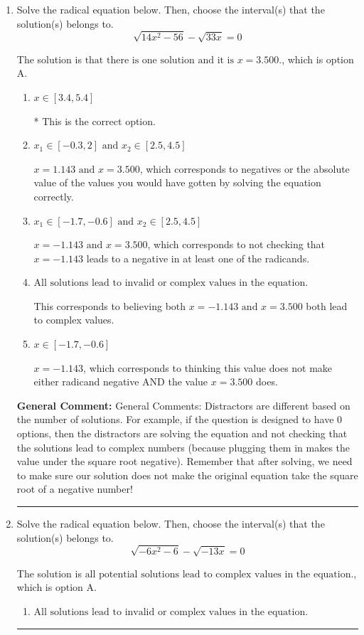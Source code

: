 \documentclass{extbook}[14pt]
\newcommand{\litem}[1]{\item #1

\rule{\textwidth}{0.4pt}}
\begin{document}
\begin{enumerate}\litem{
Solve the radical equation below. Then, choose the interval(s) that the solution(s) belongs to.
\[ \sqrt{14 x^2 - 56} - \sqrt{33 x} = 0 \]

The solution is \( \text{that there is one solution and it is } x = 3.500. \), which is option A.\begin{enumerate}[label=\Alph*.]
\item \( x \in [3.4,5.4] \)

* This is the correct option.
\item \( x_1 \in [-0.3, 2] \text{ and } x_2 \in [2.5,4.5] \)

$x = 1.143 \text{ and } x = 3.500$, which corresponds to negatives or the absolute value of the values you would have gotten by solving the equation correctly.
\item \( x_1 \in [-1.7, -0.6] \text{ and } x_2 \in [2.5,4.5] \)

$x = -1.143 \text{ and } x = 3.500$, which corresponds to not checking that $x = -1.143$ leads to a negative in at least one of the radicands.
\item \( \text{All solutions lead to invalid or complex values in the equation.} \)

This corresponds to believing both $x = -1.143 \text{ and } x = 3.500$ both lead to complex values.
\item \( x \in [-1.7,-0.6] \)

$x = -1.143$, which corresponds to thinking this value does not make either radicand negative AND the value $x = 3.500$ does.
\end{enumerate}

\textbf{General Comment:} General Comments: Distractors are different based on the number of solutions. For example, if the question is designed to have 0 options, then the distractors are solving the equation and not checking that the solutions lead to complex numbers (because plugging them in makes the value under the square root negative). Remember that after solving, we need to make sure our solution does not make the original equation take the square root of a negative number!
}
\litem{
Solve the radical equation below. Then, choose the interval(s) that the solution(s) belongs to.
\[ \sqrt{-6 x^2 - 6} - \sqrt{-13 x} = 0 \]

The solution is \( \text{all potential solutions lead to complex values in the equation.} \), which is option A.\begin{enumerate}[label=\Alph*.]
\item \( \text{All solutions lead to invalid or complex values in the equation.} \)


\end{enumerate}}
\end{enumerate}
\end{document}
